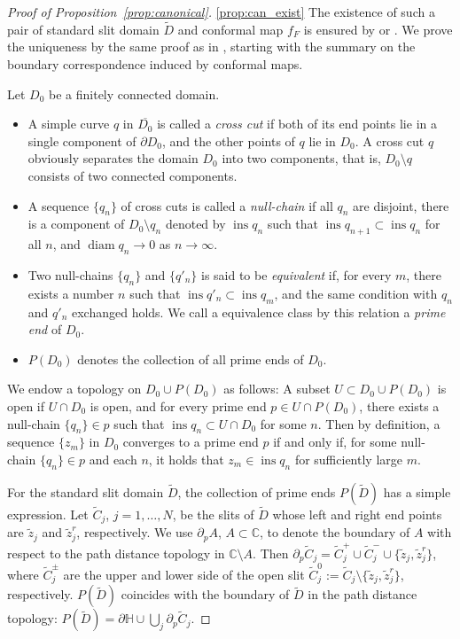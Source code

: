 \documentclass[preprint,12pt]{elsarticle}
\theoremstyle{definition}
\newcommand{\C}{\mathbb{C}}
\newcommand{\uhp}{\mathbb{H}}
\DeclareMathOperator{\diam}{diam}
\DeclareMathOperator{\ins}{ins}
\begin{document}
\begin{proof}[Proof of Proposition~\ref{prop:canonical}]
\eqref{prop:can_exist}
The existence of such a pair of standard slit domain $\tilde{D}$ and
conformal map $f_F$ is ensured by \cite[Theorem~7.2]{CFR16} or \cite[Section~2.2]{BF08}.
We prove the uniqueness by the same proof as in \cite[Theorem IX.23]{Ts59},
starting with the summary on the boundary correspondence
induced by conformal maps.

Let $D_0$ be a finitely connected domain.
\begin{itemize}
\item A simple curve $q$ in $\overline{D_0}$ is called a \emph{cross cut}
if both of its end points lie in a single component of $\partial D_0$,
and the other points of $q$ lie in $D_0$.
A cross cut $q$ obviously separates the domain $D_0$ into two components,
that is, $D_0 \setminus q$ consists of two connected components.
\item A sequence $\{q_n\}$ of cross cuts is called a \emph{null-chain}
if all $q_n$ are disjoint, there is a component of $D_0 \setminus q_n$
denoted by $\ins q_n$ such that $\ins q_{n+1} \subset \ins q_n$ for all $n$,
and $\diam q_n \to 0$ as $n \to \infty$.
\item Two null-chains $\{q_n\}$ and $\{q'_n\}$ is said to be \emph{equivalent}
if, for every $m$, there exists a number $n$ such that $\ins q'_n \subset \ins q_m$,
and the same condition with $q_n$ and $q'_n$ exchanged holds.
We call a equivalence class by this relation a \emph{prime end} of $D_0$.
\item $P(D_0)$ denotes the collection of all prime ends of $D_0$.
\end{itemize}
We endow a topology on $D_0 \cup P(D_0)$ as follows:
A subset $U \subset D_0 \cup P(D_0)$ is open if $U \cap D_0$ is open,
and for every prime end $p \in U \cap P(D_0)$, there exists
a null-chain $\{q_n\} \in p$ such that $\ins q_n \subset U \cap D_0$ for some $n$.
Then by definition, a sequence $\{z_m\}$ in $D_0$ converges to a prime end $p$
if and only if, for some null-chain $\{q_n\} \in p$ and each $n$, it holds that
$z_m \in \ins q_{n}$ for sufficiently large $m$.

For the standard slit domain $\tilde{D}$,
the collection of prime ends $P(\tilde{D})$ has a simple expression.
Let $\tilde{C}_j$, $j=1, \ldots, N$, be the slits of $\tilde{D}$
whose left and right end points are $\tilde{z}_j$ and $\tilde{z}^r_j$, respectively.
We use $\partial_p A$, $A \subset \C$, to denote the boundary of $A$
with respect to the path distance topology in $\C \setminus A$.
Then
$\partial_p \tilde{C}_j=\tilde{C}^+_j \cup \tilde{C}^-_j
\cup \{\tilde{z}_j, \tilde{z}^r_j\}$,
where $\tilde{C}^{\pm}_j$ are the upper and lower side of the open slit
$\tilde{C}^0_j:=\tilde{C}_j \setminus \{\tilde{z}_j, \tilde{z}^r_j\}$, respectively.
$P(\tilde{D})$ coincides with the boundary of $\tilde{D}$
in the path distance topology:
$P(\tilde{D})=\partial \uhp \cup \bigcup_j \partial_p \tilde{C}_j$.


\end{proof}
\end{document}
